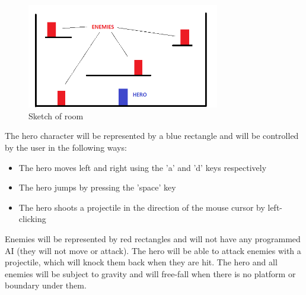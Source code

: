\documentclass[12pt, titlepage]{article}
\begin{document}
\begin{figure}[hB]
\begin{center}
\includegraphics[width=0.75\textwidth]{demo}
\caption{Sketch of room} \label{fig:room}
\end{center}
\end{figure}

The hero character will be represented by a blue rectangle and will be controlled by the user in the following ways:

\begin{itemize}
  \item The hero moves left and right using the 'a' and 'd' keys respectively
  \item The hero jumps by pressing the 'space' key
  \item The hero shoots a projectile in the direction of the mouse cursor by left-clicking
\end{itemize}

Enemies will be represented by red rectangles and will not have any programmed AI (they will not move or attack).  The hero will be able to attack enemies with a projectile, which will knock them back when they are hit.  The hero and all enemies will be subject to gravity and will free-fall when there is no platform or boundary under them.
\end{document}

